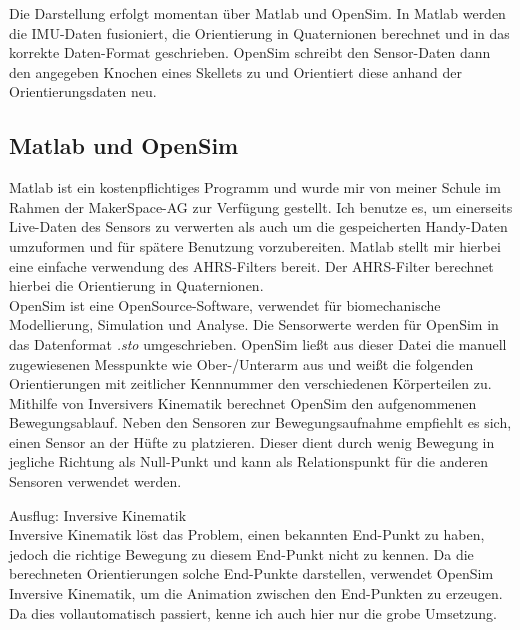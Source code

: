Die Darstellung erfolgt momentan über Matlab und OpenSim. In Matlab werden die IMU-Daten
fusioniert, die Orientierung in Quaternionen berechnet und in das korrekte Daten-Format geschrieben. 
OpenSim schreibt den Sensor-Daten dann den angegeben Knochen eines Skellets zu und Orientiert diese anhand 
der Orientierungsdaten neu.

\subsection{Matlab und OpenSim}
Matlab ist ein kostenpflichtiges Programm und wurde mir von meiner Schule im Rahmen der MakerSpace-AG zur Verfügung 
gestellt. Ich benutze es, um einerseits Live-Daten des Sensors zu verwerten als auch um die gespeicherten Handy-Daten 
umzuformen und für spätere Benutzung vorzubereiten. Matlab stellt mir hierbei eine einfache verwendung des AHRS-Filters
bereit. Der AHRS-Filter berechnet hierbei die Orientierung in Quaternionen. \\ 
OpenSim ist eine OpenSource-Software, verwendet für biomechanische Modellierung, Simulation und Analyse. 
Die Sensorwerte werden für OpenSim in das Datenformat \textit{.sto} umgeschrieben. OpenSim ließt aus dieser Datei die 
manuell zugewiesenen Messpunkte wie Ober-/Unterarm aus und weißt die folgenden Orientierungen mit zeitlicher Kennnummer
den verschiedenen Körperteilen zu. Mithilfe von Inversivers Kinematik berechnet OpenSim den aufgenommenen Bewegungsablauf.
Neben den Sensoren zur Bewegungsaufnahme empfiehlt es sich, einen Sensor an der Hüfte zu platzieren. Dieser dient durch
wenig Bewegung in jegliche Richtung als Null-Punkt und kann als Relationspunkt für die anderen Sensoren verwendet werden.

{\Large Ausflug: Inversive Kinematik}\\
Inversive Kinematik löst das Problem, einen bekannten End-Punkt zu haben, jedoch die richtige 
Bewegung zu diesem End-Punkt nicht zu kennen. Da die berechneten Orientierungen solche End-Punkte darstellen, verwendet 
OpenSim Inversive Kinematik, um die Animation zwischen den End-Punkten zu erzeugen. Da dies vollautomatisch passiert, 
kenne ich auch hier nur die grobe Umsetzung.
